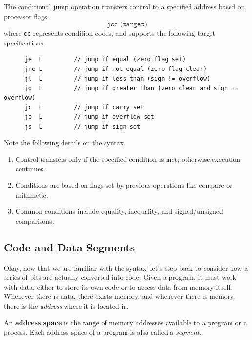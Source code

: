   \begin{definition}
    \label{def:conditional-jump}
    The conditional jump operation transfers control to a specified address based on processor flags.
    \begin{equation}
      \texttt{jcc (target)}
    \end{equation}
    where \texttt{cc} represents condition codes, and supports the following target specifications.
    \begin{lstlisting}
      je  L         // jump if equal (zero flag set)
      jne L         // jump if not equal (zero flag clear)
      jl  L         // jump if less than (sign != overflow)
      jg  L         // jump if greater than (zero clear and sign == overflow)
      jc  L         // jump if carry set
      jo  L         // jump if overflow set
      js  L         // jump if sign set
    \end{lstlisting}
    Note the following details on the syntax.
    \begin{enumerate}
      \item Control transfers only if the specified condition is met; otherwise execution continues.
      \item Conditions are based on flags set by previous operations like compare or arithmetic.
      \item Common conditions include equality, inequality, and signed/unsigned comparisons.
    \end{enumerate}
  \end{definition}

\subsection{Code and Data Segments}

  Okay, now that we are familiar with the syntax, let's step back to consider how a series of bits are actually converted into code. Given a program, it must work with data, either to store its own code or to access data from memory itself. Whenever there is data, there exists memory, and whenever there is memory, there is the \textit{address} where it is located in. 

  \begin{definition}
    \label{def:address-space}
    An \textbf{address space} is the range of memory addresses available to a program or a process. Each address space of a program is also called a \textit{segment}. 
  \end{definition}

